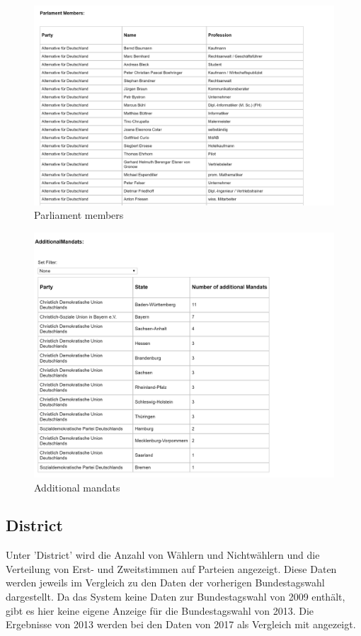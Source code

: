 \documentclass[a4paper]{scrreprt}
\begin{document}
\begin{figure}[H]
\centering
\includegraphics[width=\textwidth]{images/parliament_members.png}
\caption {Parliament members}
\end{figure}

\begin{figure}[H]
\centering
\includegraphics[width=\textwidth]{images/additional_mandats.png}
\caption {Additional mandats}
\end{figure}

\subsection{District}

Unter 'District' wird die Anzahl von Wählern und Nichtwählern und die Verteilung von Erst- und Zweitstimmen auf Parteien angezeigt. Diese Daten werden jeweils im Vergleich zu den Daten der vorherigen Bundestagswahl dargestellt. Da das System keine Daten zur Bundestagswahl von 2009 enthält, gibt es hier keine eigene Anzeige für die Bundestagswahl von 2013. Die Ergebnisse von 2013 werden bei den Daten von 2017 als Vergleich mit angezeigt.
\end{document}
